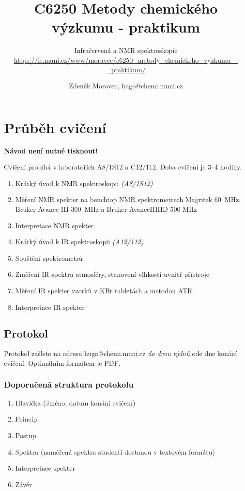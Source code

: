 \documentclass[12pt]{article}
\title{C6250 Metody chemického výzkumu - praktikum}
\subtitle{Infračervená a NMR spektroskopie \\ \url{https://is.muni.cz/www/moravec/c6250_metody_chemickeho_vyzkumu_-_praktikum/}}
\author %
{Zdeněk Moravec, hugo@chemi.muni.cz}
\date{}
\begin{document}
\maketitle

\pagebreak

\section{Průběh cvičení}

	\textbf{Návod není nutné tisknout!}

	Cvičení probíhá v laboratořích A8/1S12 a C12/112. Doba cvičení je 3--4 hodiny.

	\begin{enumerate}
	\item Krátký úvod k NMR spektroskopii \textit{(A8/1S12)}
	\item Měření NMR spekter na benchtop NMR spektrometrech Magritek 60~MHz, Bruker Avance III 300~MHz a Bruker AvanceIIIHD 500 MHz
	\item Interpretace NMR spekter
	\item Krátký úvod k IR spektroskopii \textit{(A12/112)}
	\item Spuštění spektrometrů
	\item Změření IR spektra atmosféry, stanovení vlhkosti uvnitř přístroje
	\item Měření IR spekter vzorků v KBr tabletách a metodou ATR
	\item Interpretace IR spekter
	\end{enumerate}

\subsection{Protokol}

Protokol zašlete na adresu hugo@chemi.muni.cz \textit{do dvou týdnů} ode dne konání cvičení. Optimálním formátem je PDF.

\subsubsection{Doporučená struktura protokolu}

	\begin{enumerate}
	\item Hlavička (Jméno, datum konání cvičení)
	\item Princip
	\item Postup
	\item Spektra (naměřená spektra studenti dostanou v textovém formátu)
	\item Interpretace spekter
	\item Závěr
	\end{enumerate}
\end{document}

